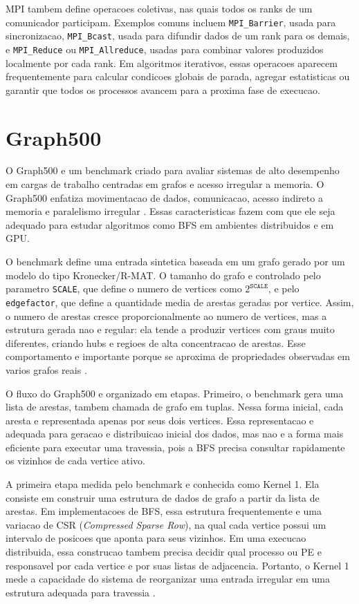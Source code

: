 MPI tambem define operacoes coletivas, nas quais todos os ranks de um
comunicador participam. Exemplos comuns incluem \texttt{MPI\_Barrier}, usada
para sincronizacao, \texttt{MPI\_Bcast}, usada para difundir dados de um rank
para os demais, e \texttt{MPI\_Reduce} ou \texttt{MPI\_Allreduce}, usadas para
combinar valores produzidos localmente por cada rank. Em algoritmos iterativos,
essas operacoes aparecem frequentemente para calcular condicoes globais de
parada, agregar estatisticas ou garantir que todos os processos avancem para a
proxima fase de execucao.

\section{Graph500}
O Graph500 e um benchmark criado para avaliar sistemas de alto desempenho em
cargas de trabalho centradas em grafos e acesso irregular a memoria. O Graph500 
enfatiza movimentacao de dados, comunicacao, acesso indireto a memoria e 
paralelismo irregular \cite{murphygraph500}. Essas caracteristicas 
fazem com que ele seja adequado para estudar algoritmos como BFS em ambientes 
distribuidos e em GPU.

O benchmark define uma entrada sintetica baseada em um grafo gerado por um
modelo do tipo Kronecker/R-MAT. O tamanho do grafo e controlado pelo parametro
\texttt{SCALE}, que define o numero de vertices como $2^{\texttt{SCALE}}$, e
pelo \texttt{edgefactor}, que define a quantidade media de arestas geradas por
vertice. Assim, o numero de arestas cresce proporcionalmente ao numero de
vertices, mas a estrutura gerada nao e regular: ela tende a produzir vertices
com graus muito diferentes, criando hubs e regioes de alta concentracao de
arestas. Esse comportamento e importante porque se aproxima de propriedades
observadas em varios grafos reais \cite{graph500spec}.

O fluxo do Graph500 e organizado em etapas. Primeiro, o benchmark gera uma lista
de arestas, tambem chamada de grafo em tuplas. Nessa forma inicial, cada aresta
e representada apenas por seus dois vertices. Essa representacao e adequada para
geracao e distribuicao inicial dos dados, mas nao e a forma mais eficiente para
executar uma travessia, pois a BFS precisa consultar rapidamente os vizinhos de
cada vertice ativo.

A primeira etapa medida pelo benchmark e conhecida como Kernel 1. Ela consiste
em construir uma estrutura de dados de grafo a partir da lista de arestas. Em
implementacoes de BFS, essa estrutura frequentemente e uma variacao de CSR
(\textit{Compressed Sparse Row}), na qual cada vertice possui um intervalo de
posicoes que aponta para seus vizinhos. Em uma execucao distribuida, essa
construcao tambem precisa decidir qual processo ou PE e responsavel por cada
vertice e por suas listas de adjacencia. Portanto, o Kernel 1 mede a capacidade
do sistema de reorganizar uma entrada irregular em uma estrutura adequada para
travessia \cite{graph500spec}.

